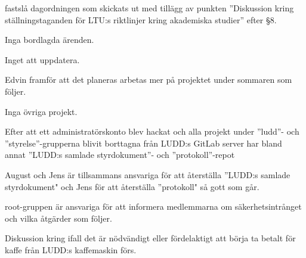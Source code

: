 \documentclass{protokoll}
\date{2019-05-07}  %
\begin{document}
\newpage  


\begin{beslut}
     \att fastslå dagordningen som skickats ut med tillägg av punkten
     ''Diskussion kring ställningstaganden för LTU:s riktlinjer kring
     akademiska studier'' efter \S 8.
\end{beslut}

Inga bordlagda ärenden.

Inget att uppdatera. 

Edvin framför att det planeras arbetas mer på projektet under sommaren som
följer. 

Inga övriga projekt. 

Efter att ett administratörskonto blev hackat och alla projekt under ''ludd''-
och ''styrelse''-grupperna blivit borttagna från LUDD:s GitLab server har bland
annat ''LUDD:s samlade styrdokument''- och ''protokoll''-repot

August och Jens är tillsammans ansvariga för att återställa ''LUDD:s samlade 
styrdokument" och Jens för att återställa ''protokoll" så gott som går. 

root-gruppen är ansvariga för att informera medlemmarna om säkerhetsintrånget
och vilka åtgärder som följer.

 Diskussion kring ifall det är nödvändigt eller fördelaktigt att börja ta
 betalt för kaffe från LUDD:s kaffemaskin förs. 
\end{document}
